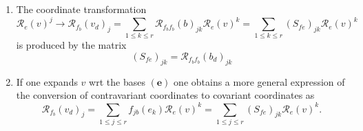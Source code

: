 \documentclass[aps,preprint]{revtex4}
\begin{document}
\begin{enumerate}
\begin{enumerate}
\begin{enumerate}
\item The coordinate transformation 
\begin{equation}
\mathcal{R}_{e}\left( v\right) ^{j}\rightarrow \mathcal{R}_{f_{b}}\left(
v_{d}\right) _{j}=\sum_{1\leq k\leq r}\mathcal{R}_{f_{b}f_{b}}\left(
b\right) _{jk}\mathcal{R}_{e}\left( v\right) ^{k}=\sum_{1\leq k\leq r}\left(
S_{fe}\right) _{jk}\mathcal{R}_{e}\left( v\right) ^{k}
\end{equation}%
is produced by the matrix 
\begin{equation}
\left( S_{fe}\right) _{jk}=\mathcal{R}_{f_{b}f_{b}}\left( b_{d}\right) _{jk}
\end{equation}

\item If one expands $v$ wrt the bases $\left( \boldsymbol{e}\right) $ one
obtains a more general expression of the conversion of contravariant
coordinates to covariant coordinates as 
\begin{equation}
\mathcal{R}_{f_{b}}\left( v_{d}\right) _{j}=\sum_{1\leq j\leq r}f_{jb}\left(
e_{k}\right) \mathcal{R}_{e}\left( v\right) ^{k}=\sum_{1\leq j\leq r}\left(
S_{fe}\right) _{jk}\mathcal{R}_{e}\left( v\right) ^{k}.
\end{equation}


\end{enumerate}
\end{enumerate}
\end{enumerate}
\end{document}
